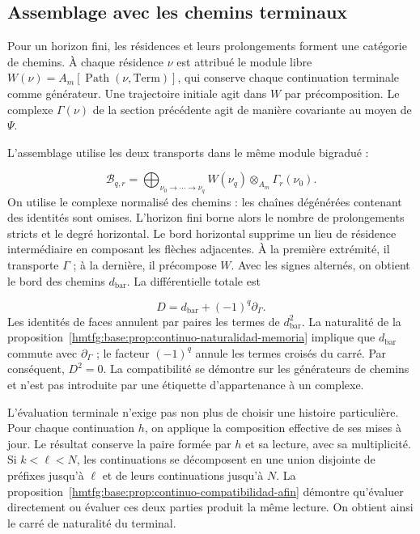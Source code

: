 \subsection{Assemblage avec les chemins terminaux}
Pour un horizon fini, les résidences et leurs prolongements forment une catégorie de chemins. À chaque résidence \(\nu\) est attribué le module libre \(W(\nu)=A_m[\operatorname{Path}(\nu,\mathrm{Term})]\), qui conserve chaque continuation terminale comme générateur. Une trajectoire initiale agit dans \(W\) par précomposition. Le complexe \(\Gamma(\nu)\) de la section précédente agit de manière covariante au moyen de \(\Psi\).

L'assemblage utilise les deux transports dans le même module bigradué :

\[
\mathcal B_{q,r}=
\bigoplus_{\nu_0\to\cdots\to\nu_q}
W(\nu_q)\otimes_{A_m}\Gamma_r(\nu_0).
\]
On utilise le complexe normalisé des chemins : les chaînes dégénérées contenant des identités sont omises. L'horizon fini borne alors le nombre de prolongements stricts et le degré horizontal. Le bord horizontal supprime un lieu de résidence intermédiaire en composant les flèches adjacentes. À la première extrémité, il transporte \(\Gamma\) ; à la dernière, il précompose \(W\). Avec les signes alternés, on obtient le bord des chemins \(d_{\mathrm{bar}}\). La différentielle totale est

\[
D=d_{\mathrm{bar}}+(-1)^q\partial_\Gamma.
\]
Les identités de faces annulent par paires les termes de \(d_{\mathrm{bar}}^2\). La naturalité de la proposition~\ref{hmtfg:base:prop:continuo-naturalidad-memoria} implique que \(d_{\mathrm{bar}}\) commute avec \(\partial_\Gamma\) ; le facteur \((-1)^q\) annule les termes croisés du carré. Par conséquent, \(D^2=0\). La compatibilité se démontre sur les générateurs de chemins et n'est pas introduite par une étiquette d'appartenance à un complexe.

L'évaluation terminale n'exige pas non plus de choisir une histoire particulière. Pour chaque continuation \(h\), on applique la composition effective de ses mises à jour. Le résultat conserve la paire formée par \(h\) et sa lecture, avec sa multiplicité. Si \(k<\ell<N\), les continuations se décomposent en une union disjointe de préfixes jusqu'à \(\ell\) et de leurs continuations jusqu'à \(N\). La proposition~\ref{hmtfg:base:prop:continuo-compatibilidad-afin} démontre qu'évaluer directement ou évaluer ces deux parties produit la même lecture. On obtient ainsi le carré de naturalité du terminal.


